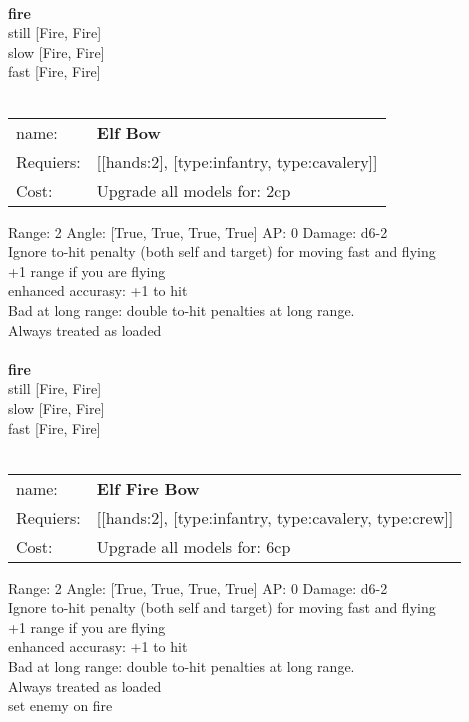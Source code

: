 \ \\ {\bf fire } \\
still [Fire, Fire] \\
slow [Fire, Fire] \\
fast [Fire, Fire] \\

\ \\
\begin{tabular}{ll}
name: & {\bf Elf Bow } \\
Requiers: & [[hands:2], [type:infantry, type:cavalery]] \\
Cost: & Upgrade all models for: 2cp \\
\end{tabular}



Range: 2  Angle: [True, True, True, True] AP: 0 Damage: d6-2 \\
Ignore to-hit penalty (both self and target) for moving fast and flying\\ 
+1 range if you are flying\\ 
enhanced accurasy: +1 to hit\\ 
Bad at long range: double to-hit penalties at long range.\\ 
Always treated as loaded\\ 







\ \\ {\bf fire } \\
still [Fire, Fire] \\
slow [Fire, Fire] \\
fast [Fire, Fire] \\

\ \\
\begin{tabular}{ll}
name: & {\bf Elf Fire Bow } \\
Requiers: & [[hands:2], [type:infantry, type:cavalery, type:crew]] \\
Cost: & Upgrade all models for: 6cp \\
\end{tabular}



Range: 2  Angle: [True, True, True, True] AP: 0 Damage: d6-2 \\
Ignore to-hit penalty (both self and target) for moving fast and flying\\ 
+1 range if you are flying\\ 
enhanced accurasy: +1 to hit\\ 
Bad at long range: double to-hit penalties at long range.\\ 
Always treated as loaded\\ 
set enemy on fire\\ 







